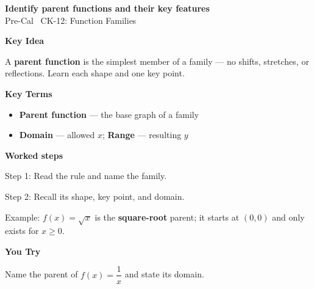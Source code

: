 \documentclass[12pt]{article}
\begin{document}
\begin{center}{\Large \textbf{Identify parent functions and their key features}}\\[2pt]{\small Pre-Cal \textbar\ CK-12: Function Families}\end{center}\vspace{0.25cm}

{\large\textbf{Key Idea}}\par\smallskip
A \textbf{parent function} is the simplest member of a family — no shifts, stretches, or reflections. Learn each shape and one key point.\par


{\large\textbf{Key Terms}}\par\smallskip
\begin{itemize}[leftmargin=1.4em]
  \item \textbf{Parent function} — the base graph of a family
  \item \textbf{Domain} — allowed $x$; \textbf{Range} — resulting $y$
\end{itemize}


{\large\textbf{Worked steps}}\par\smallskip
Step 1: Read the rule and name the family.\par
Step 2: Recall its shape, key point, and domain.\par
Example: $f(x)=\sqrt{x}$ is the \textbf{square-root} parent; it starts at $(0,0)$ and only exists for $x\ge 0$.\par


{\large\textbf{You Try}}\par\smallskip
Name the parent of $f(x)=\dfrac{1}{x}$ and state its domain.\par
\end{document}
